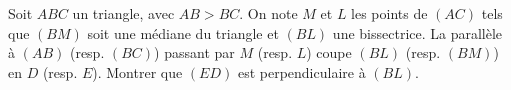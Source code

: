 Soit $ABC$ un triangle, avec $AB > BC$. On note $M$ et $L$ les points de $(AC)$ tels que $(BM)$ soit une médiane du triangle et $(BL)$ une bissectrice. La parallèle à $(AB)$ (resp. $(BC)$) passant par $M$ (resp. $L$) coupe $(BL)$ (resp. $(BM)$) en $D$ (resp. $E$). Montrer que $(ED)$ est perpendiculaire à $(BL)$.
